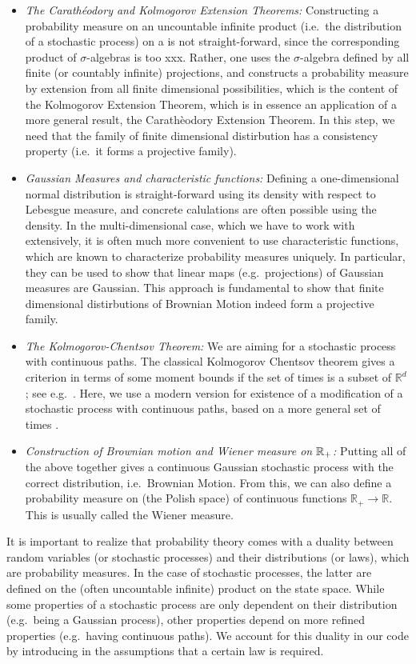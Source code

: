 \documentclass[lean]{DraftAFM}
\begin{document}
\begin{itemize}
\item {\em The Carathéodory and Kolmogorov Extension Theorems:} Constructing a probability measure on an uncountable infinite product (i.e.\ the distribution of a stochastic process) on a is not straight-forward, since the corresponding product of $\sigma$-algebras is too xxx. Rather, one uses the $\sigma$-algebra defined by all finite (or countably infinite) projections, and constructs a probability measure by extension from all finite dimensional possibilities, which is the content of the Kolmogorov Extension Theorem, which is in essence an application of a more general result, the Carathèodory Extension Theorem. In this step, we need that the family of finite dimensional distirbution has a consistency property (i.e.\ it forms a projective family).
\item {\em Gaussian Measures and characteristic functions:} Defining a one-dimensional normal distribution is straight-forward using its density with respect to Lebesgue measure, and concrete calulations are often possible using the density. In the multi-dimensional case, which we have to work with extensively, it is often much more convenient to use characteristic functions, which are known to characterize probability measures uniquely. In particular, they can be used to show that linear maps (e.g.\ projections) of Gaussian measures are Gaussian. This approach is fundamental to show that finite dimensional distirbutions of Brownian Motion indeed form a projective family.
\item {\em The Kolmogorov-Chentsov Theorem:} We are aiming for a stochastic process with continuous paths. The classical Kolmogorov Chentsov theorem gives a criterion in terms of some moment bounds if the set of times is a subset of $\mathbb R^d$; see e.g.\ \cite{kallenberg2021}. Here, we use a modern version for existence of a modification of a stochastic process with continuous paths, based on a more general set of times \cite{kratschmer2023kolmogorov}.
\item {\em Construction of Brownian motion and Wiener measure on $\mathbb{R}_+$:} Putting all of the above together gives a continuous Gaussian stochastic process with the correct distribution, i.e.\ Brownian Motion. From this, we can also define a probability measure on (the Polish space) of continuous functions $\mathbb R_+ \to \mathbb R$. This is usually called the Wiener measure.
\end{itemize}
It is important to realize that probability theory comes with a duality between random variables (or stochastic processes) and their distributions (or laws), which are probability measures. In the case of stochastic processes, the latter are defined on the (often uncountable infinite) product on the state space. While some properties of a stochastic process are only dependent on their distribution (e.g.\ being a Gaussian process), other properties depend on more refined properties (e.g.\ having continuous paths). We account for this duality in our code by introducing in the assumptions that a certain law is required.
\end{document}
